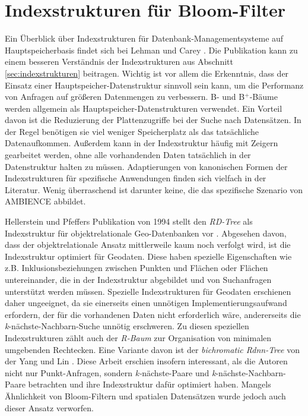 \section{Indexstrukturen für Bloom-Filter}\label{sec:bloom-index}
Ein Überblick über Indexstrukturen für Datenbank-Managementsysteme auf Hauptspei\-cher\-basis findet sich bei Lehman und Carey \cite{Lehman1986}. Die Publikation kann zu einem besseren Verständnis der Indexstrukturen aus Abschnitt \ref{sec:indexstrukturen} beitragen. Wichtig ist vor allem die Erkenntnis, dass der Einsatz einer Hauptspeicher-Datenstruktur sinnvoll sein kann, um die Performanz von Anfragen auf größeren Datenmengen zu verbessern. B- und B$^+$-Bäume werden allgemein als Hauptspeicher-Datenstruk\-turen verwendet. Ein Vorteil davon ist die Reduzierung der Plattenzugriffe bei der Suche nach Datensätzen. In der Regel benötigen sie viel weniger Speicherplatz als das tatsächliche Datenaufkommen. Außerdem kann in der Indexstruktur häufig mit Zeigern gearbeitet werden, ohne alle vorhandenden Daten tatsächlich in der Datenstruktur halten zu müssen. Adaptierungen von kanonischen Formen der Indexstrukturen für spezifische Anwendungen finden sich vielfach in der Literatur. Wenig überraschend ist darunter keine, die das spezifische Szenario von AMBIENCE abbildet.

Hellerstein und Pfeffers Publikation von 1994 stellt den \textit{RD-Tree} als Indexstruktur für objektrelationale Geo-Datenbanken vor \cite{Hellerstein1994}. Abgesehen davon, dass der objektrelationale Ansatz mittlerweile kaum noch verfolgt wird, ist die Indexstruktur optimiert für Geodaten. Diese haben spezielle Eigenschaften wie z.B. Inklusionsbeziehungen zwischen Punkten und Flächen oder Flächen untereinander, die in der Indexstruktur abgebildet und von Suchanfragen unterstützt werden müssen. Spezielle Indexstrukturen für Geodaten erschienen daher ungeeignet, da sie einerseits einen unnötigen Implementierungsaufwand erfordern, der für die vorhandenen Daten nicht erforderlich wäre, andererseits die \textit{k}-nächste-Nachbarn-Suche unnötig erschweren. Zu diesen speziellen Indexstrukturen zählt auch der \textit{R-Baum} zur Organisation von minimalen umgebenden Rechtecken. Eine Variante davon ist der \textit{bichromatic Rdnn-Tree} von der Yang und Lin \cite{Yang2002}. Diese Arbeit erschien insofern interessant, als die Autoren nicht nur Punkt-Anfragen, sondern \textit{k-}nächste-Paare und \textit{k}-nächste-Nachbarn-Paare betrachten und ihre Indexstruktur dafür optimiert haben. Mangels Ähnlichkeit von Bloom-Filtern und spatialen Datensätzen wurde jedoch auch dieser Ansatz verworfen. 

